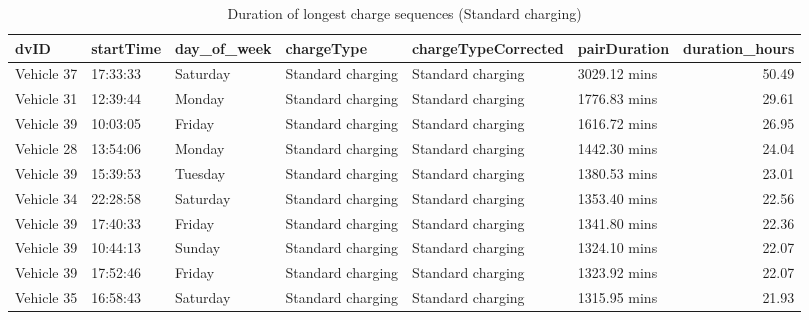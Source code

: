 \documentclass[]{article}
\begin{document}
\begin{table}[t]

\caption{\label{tab:durationLongTableStd}Duration of longest charge sequences (Standard charging)}
\centering
\begin{tabular}{l|l|l|l|l|l|r}
\hline
dvID & startTime & day\_of\_week & chargeType & chargeTypeCorrected & pairDuration & duration\_hours\\
\hline
Vehicle 37 & 17:33:33 & Saturday & Standard charging & Standard charging & 3029.12 mins & 50.49\\
\hline
Vehicle 31 & 12:39:44 & Monday & Standard charging & Standard charging & 1776.83 mins & 29.61\\
\hline
Vehicle 39 & 10:03:05 & Friday & Standard charging & Standard charging & 1616.72 mins & 26.95\\
\hline
Vehicle 28 & 13:54:06 & Monday & Standard charging & Standard charging & 1442.30 mins & 24.04\\
\hline
Vehicle 39 & 15:39:53 & Tuesday & Standard charging & Standard charging & 1380.53 mins & 23.01\\
\hline
Vehicle 34 & 22:28:58 & Saturday & Standard charging & Standard charging & 1353.40 mins & 22.56\\
\hline
Vehicle 39 & 17:40:33 & Friday & Standard charging & Standard charging & 1341.80 mins & 22.36\\
\hline
Vehicle 39 & 10:44:13 & Sunday & Standard charging & Standard charging & 1324.10 mins & 22.07\\
\hline
Vehicle 39 & 17:52:46 & Friday & Standard charging & Standard charging & 1323.92 mins & 22.07\\
\hline
Vehicle 35 & 16:58:43 & Saturday & Standard charging & Standard charging & 1315.95 mins & 21.93\\
\hline
\end{tabular}
\end{table}
\end{document}
